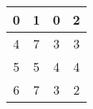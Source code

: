 \begin{center}
\begin{tabular}{|c|c|c|c|}
\hline
0 & 1 & 0 & 2\\
\hline
4 & 7 & 3 & 3\\
\hline
5 & 5 & 4 & 4\\
\hline
6 & 7 & 3 & 2\\
\hline
\end{tabular}
\end{center}